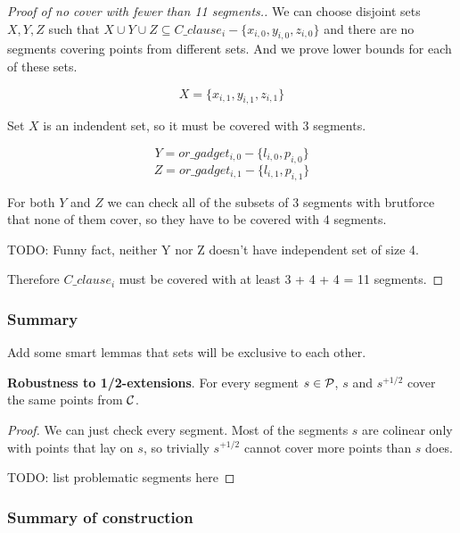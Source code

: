 \begin{proof}[Proof of no cover with fewer than 11 segments.]

We can choose disjoint sets $X, Y, Z$ such that
$X \cup Y \cup Z \subseteq C\_clause_i - \{x_{i, 0}, y_{i, 0}, z_{i, 0}\}$
and there are no segments covering points from different sets.
And we prove lower bounds for each of these sets.

$$X = \{x_{i, 1}, y_{i, 1}, z_{i, 1}\}$$

Set $X$ is an indendent set, so it must be covered with 3 segments.

$$Y = or\_gadget_{i, 0} - \{l_{i, 0}, p_{i, 0}\}$$
$$Z = or\_gadget_{i, 1} - \{l_{i, 1}, p_{i, 1}\}$$


For both $Y$ and $Z$ we can check all of the subsets of 3 segments
with brutforce that none of them cover, so they have to be covered with
4 segments.

TODO: Funny fact, neither Y nor Z doesn't have independent set of size 4.

Therefore $C\_clause_i$ must be covered with at least 3 + 4 + 4 = 11 segments.
\end{proof}

\subsubsection{Summary}

Add some smart lemmas that sets will be exclusive to each other.

\begin{lemma}
\textbf{Robustness to 1/2-extensions}. For every segment $s \in \mathcal{P}$,
$s$ and $s^{+1/2}$ cover the same points from $\mathcal{C}$.
\end{lemma}

\begin{proof}
We can just check every segment. Most of the segments $s$
are colinear only with points that lay on $s$,
so trivially $s^{+1/2}$ cannot cover more points than $s$ does.

TODO: list problematic segments here
\end{proof}


\subsubsection{Summary of construction}

